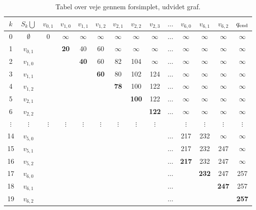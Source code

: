 \begin{table}[H]
\centering
\begin{tabular}{|c|c|c|c|c|c|c|c|c|c|c|c|c|c|} 
\hline
$k$ & $S_k \bigcup$ & $v_{0,1}$ & $v_{1,0}$ & $v_{1,1}$ & $v_{1,2}$ & $v_{2,1}$ & $v_{2,2}$ & $v_{2,3}$ & $\ldots$ & $v_{6,0}$ & $v_{6,1}$ & $v_{6,2}$ & $q_{\textrm{end}}$ \\
\hline
0 & $\emptyset$ & 0 & $\infty$ & $\infty$ & $\infty$ & $\infty$ & $\infty$ & $\infty$ & $\ldots$ & $\infty$ & $\infty$ & $\infty$ & $\infty$ \\ 
1 & $v_{0,1}$ & & \textbf{20} & 40 & 60 & $\infty$ & $\infty$ & $\infty$ & $\ldots$ & $\infty$ & $\infty$ & $\infty$ & $\infty$\\ 
2 & $v_{1,0}$ & & & \textbf{40} & 60 & 82 & 104 & $\infty$ & $\ldots$ & $\infty$ & $\infty$ & $\infty$ & $\infty$\\ 
3 & $v_{1,1}$ & & & & \textbf{60} & 80 & 102 & 124 & $\ldots$ & $\infty$ & $\infty$ & $\infty$ & $\infty$\\
4 & $v_{1,2}$ & & & & & \textbf{78} & 100 & 122 & $\ldots$ & $\infty$ & $\infty$ & $\infty$ & $\infty$\\ 
5 & $v_{2,1}$ & & & & & & \textbf{100} & 122 & $\ldots$ & $\infty$ & $\infty$ & $\infty$ & $\infty$\\ 
6 & $v_{2,2}$ & & & & & & & \textbf{122} & $\ldots$ & $\infty$ & $\infty$ & $\infty$ & $\infty$\\  
$\vdots$ & $\vdots$ & $\vdots$ & $\vdots$ & $\vdots$ & $\vdots$ & $\vdots$ & $\vdots$ & $\vdots$ &  & $\vdots$ & $\vdots$ & $\vdots$ & $\vdots$\\ 
14 & $v_{5,0}$ &  &  &  &  &  &  &  & $\ldots$ & 217 & 232 & $\infty$ & $\infty$\\ 
15 & $v_{5,1}$ &  &  &  &  &  &  &  & $\ldots$ & 217 & 232 & 247 & $\infty$\\ 
16 & $v_{5,2}$ &  &  &  &  &  &  &  & $\ldots$ & \textbf{217} & 232 & 247 & $\infty$\\ 
17 & $v_{6,0}$ &  &  &  &  &  &  &  & $\ldots$ &  & \textbf{232} & 247 & 257\\ 
18 & $v_{6,1}$ &  &  &  &  &  &  &  & $\ldots$ &  &  & \textbf{247} & 257\\ 
19 & $v_{6,2}$ &  &  &  &  &  &  &  & $\ldots$ &  &  &  & \textbf{257}\\ 
\hline
\end{tabular}
\caption{Tabel over veje gennem forsimplet, udvidet graf.}
\label{table:forsimplet_udvidet_graf}
\end{table}